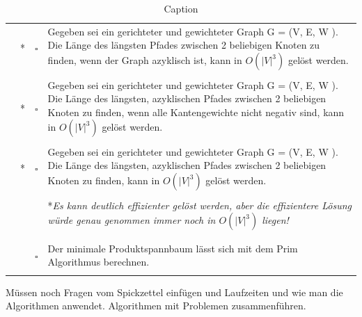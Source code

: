 \documentclass{article}
\newcommand{\checkedbox}[0]{\makebox[0pt][l]{$\square$}\raisebox{.15ex}{\hspace{0.1em}$\checkmark$}}
\begin{document}
\begin{table}[]
\begin{tabular}{ | p{1cm} | c c | p{13cm} |}
     \cite{hauptklausur21} & \checkedbox * &  $\square$  &  Gegeben sei ein gerichteter und gewichteter Graph G = (V, E, W ). Die Länge des längsten Pfades zwischen 2 beliebigen Knoten zu finden, wenn der Graph azyklisch ist, kann in $O(|V|^3)$ gelöst werden. \\ & & & \\
     
     \cite{hauptklausur21}  & \checkedbox * &  $\square$  &  Gegeben sei ein gerichteter und gewichteter Graph G = (V, E, W ). Die Länge des längsten, azyklischen Pfades\index{Pfad!azyklischer} zwischen 2 beliebigen Knoten zu finden, wenn alle Kantengewichte nicht negativ sind, kann in $O(|V|^3)$ gelöst werden. \\ & & & \\
     
      \cite{hauptklausur21}  & \checkedbox * &  $\square$  & Gegeben sei ein gerichteter und gewichteter Graph G = (V, E, W ). Die Länge des längsten, azyklischen Pfades\index{Pfad!azyklischer} zwischen 2 beliebigen Knoten zu finden, kann in $O(|V|^3)$ gelöst werden.  \\ & & & \\
        & & & *\textit{Es kann deutlich effizienter gelöst werden, aber die effizientere Lösung würde genau genommen immer noch in $O(|V|^3)$ liegen!} \\ & & & \\
        \hline \hline & & & \\
        
    \cite{nachklausur19}    & \checkedbox &  $\square$  & Der minimale Produktspannbaum\index{Spannbaum!Produkt-} lässt sich mit dem Prim Algorithmus\index{Prim} berechnen. \\ & & & \\ \hline
    \end{tabular}
    \caption{Caption}
    \label{tab:my_label}
\end{table}


Müssen noch Fragen vom Spickzettel einfügen und Laufzeiten und wie man die Algorithmen anwendet. Algorithmen mit Problemen zusammenführen. 



\printindex
{}
\listofalgorithms

\printbibliography
\end{document}
